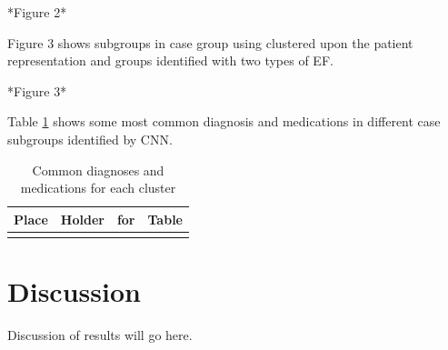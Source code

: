\documentclass[11pt]{article}
\begin{document}
	*Figure 2*
	
	Figure 3 shows subgroups in case group using clustered upon the patient representation and groups identified with two types of EF. 
	
	*Figure 3*
	
	Table \ref{tab:clusterDiagMed} shows some most common diagnosis and medications in different case subgroups identified by CNN.
	
\begin{table}
	\vspace*{3mm}
	\caption{Common diagnoses and medications for each cluster}
	\label{tab:clusterDiagMed}
	\vspace*{2mm}
	\centering
	\begin{tabular}{c|ccc}
		\hline
		Place & Holder & for & Table\\ 
		\hline
		&  &  & \\
		\hline
	\end{tabular}
\end{table}
	
	
	
	\section{Discussion}
	\label{sec:conclusion}
	
	Discussion of results will go here.
	
	
	
	
	
\end{document}
